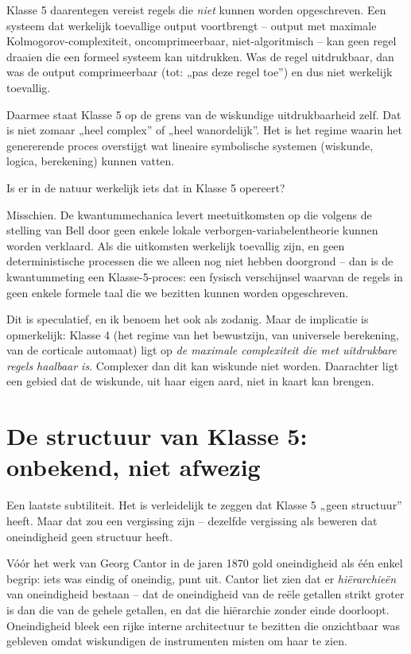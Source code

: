 \documentclass[11pt, twoside, openright]{book}
\begin{document}
Klasse 5 daarentegen vereist regels die \textit{niet} kunnen worden opgeschreven. Een systeem dat werkelijk toevallige output voortbrengt -- output met maximale Kolmogorov-complexiteit, oncomprimeerbaar, niet-algoritmisch -- kan geen regel draaien die een formeel systeem kan uitdrukken. Was de regel uitdrukbaar, dan was de output comprimeerbaar (tot: „pas deze regel toe”) en dus niet werkelijk toevallig.

Daarmee staat Klasse 5 op de grens van de wiskundige uitdrukbaarheid zelf. Dat is niet zomaar „heel complex” of „heel wanordelijk”. Het is het regime waarin het genererende proces overstijgt wat lineaire symbolische systemen (wiskunde, logica, berekening) kunnen vatten.

Is er in de natuur werkelijk iets dat in Klasse 5 opereert?

Misschien. De kwantummechanica levert meetuitkomsten op die volgens de stelling van Bell door geen enkele lokale verborgen-variabelentheorie kunnen worden verklaard. Als die uitkomsten werkelijk toevallig zijn, en geen deterministische processen die we alleen nog niet hebben doorgrond -- dan is de kwantummeting een Klasse-5-proces: een fysisch verschijnsel waarvan de regels in geen enkele formele taal die we bezitten kunnen worden opgeschreven.

Dit is speculatief, en ik benoem het ook als zodanig. Maar de implicatie is opmerkelijk: Klasse 4 (het regime van het bewustzijn, van universele berekening, van de corticale automaat) ligt op \textit{de maximale complexiteit die met uitdrukbare regels haalbaar is}. Complexer dan dit kan wiskunde niet worden. Daarachter ligt een gebied dat de wiskunde, uit haar eigen aard, niet in kaart kan brengen.

\section*{De structuur van Klasse 5: onbekend, niet afwezig}

Een laatste subtiliteit. Het is verleidelijk te zeggen dat Klasse 5 „geen structuur” heeft. Maar dat zou een vergissing zijn -- dezelfde vergissing als beweren dat oneindigheid geen structuur heeft.

Vóór het werk van Georg Cantor in de jaren 1870 gold oneindigheid als één enkel begrip: iets was eindig of oneindig, punt uit. Cantor liet zien dat er \textit{hiërarchieën} van oneindigheid bestaan -- dat de oneindigheid van de reële getallen strikt groter is dan die van de gehele getallen, en dat die hiërarchie zonder einde doorloopt. Oneindigheid bleek een rijke interne architectuur te bezitten die onzichtbaar was gebleven omdat wiskundigen de instrumenten misten om haar te zien.
\end{document}
